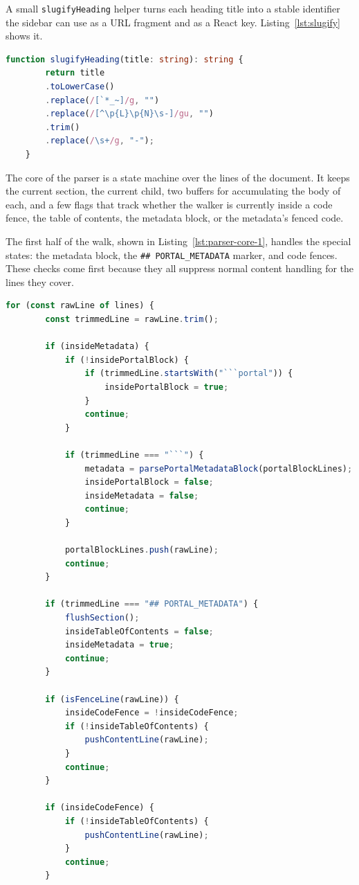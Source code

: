 A small \texttt{slugifyHeading} helper turns each heading title into a stable identifier the sidebar can use as a URL fragment and as a React key. Listing~\ref{lst:slugify} shows it.

\begin{lstlisting}[language=TypeScript,caption={\texttt{slugifyHeading} converts a heading title into a stable identifier.},label={lst:slugify}]
	function slugifyHeading(title: string): string {
		return title
		.toLowerCase()
		.replace(/[`*_~]/g, "")
		.replace(/[^\p{L}\p{N}\s-]/gu, "")
		.trim()
		.replace(/\s+/g, "-");
	}
\end{lstlisting}

The core of the parser is a state machine over the lines of the document. It keeps the current section, the current child, two buffers for accumulating the body of each, and a few flags that track whether the walker is currently inside a code fence, the table of contents, the metadata block, or the metadata's fenced code.

The first half of the walk, shown in Listing~\ref{lst:parser-core-1}, handles the special states: the metadata block, the \texttt{\#\# PORTAL\_METADATA} marker, and code fences. These checks come first because they all suppress normal content handling for the lines they cover.

\begin{lstlisting}[language=TypeScript,caption={The first half of \texttt{parseRepositoryDocument}: special-state handling for metadata, the portal block, and code fences.},label={lst:parser-core-1}]
	for (const rawLine of lines) {
		const trimmedLine = rawLine.trim();
		
		if (insideMetadata) {
			if (!insidePortalBlock) {
				if (trimmedLine.startsWith("```portal")) {
					insidePortalBlock = true;
				}
				continue;
			}
			
			if (trimmedLine === "```") {
				metadata = parsePortalMetadataBlock(portalBlockLines);
				insidePortalBlock = false;
				insideMetadata = false;
				continue;
			}
			
			portalBlockLines.push(rawLine);
			continue;
		}
		
		if (trimmedLine === "## PORTAL_METADATA") {
			flushSection();
			insideTableOfContents = false;
			insideMetadata = true;
			continue;
		}
		
		if (isFenceLine(rawLine)) {
			insideCodeFence = !insideCodeFence;
			if (!insideTableOfContents) {
				pushContentLine(rawLine);
			}
			continue;
		}
		
		if (insideCodeFence) {
			if (!insideTableOfContents) {
				pushContentLine(rawLine);
			}
			continue;
		}
	\end{lstlisting}
	
